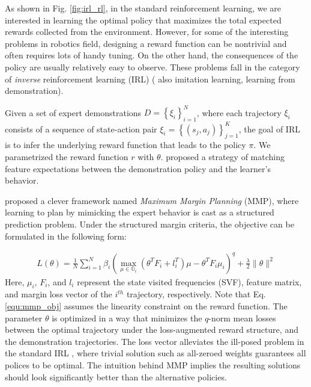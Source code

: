 \documentclass[../thesis.tex]{subfiles}
\begin{document}
As shown in Fig. \ref{fig:irl_rl}, in the standard reinforcement learning, we are interested in learning the optimal policy that maximizes the total expected rewards collected from the environment. 
However, for some of the interesting problems in robotics field, designing a reward function can be nontrivial and often requires lots of handy tuning. 
On the other hand, the consequences of the policy are usually relatively easy to observe. 
These problems fall in the category of \textit{inverse} reinforcement learning (IRL) \cite{ng2000algorithms} ( also imitation learning, learning from demonstration).



Given a set of expert demonstrations $D=\left\{ \xi_i \right\}_{i=1}^{N}$, where each trajectory $\xi_i$ consists of a sequence of state-action pair $\xi_i = \left\{ (s_j, a_j) \right\}_{j=1}^{K}$, the goal of IRL is to infer the underlying reward function that leads to the policy $\pi$. 
We parametrized the reward function $r$ with $\theta$. \citet{abbeel2004apprenticeship} proposed a strategy of matching feature expectations between the demonstration policy and the learner's behavior. 

\citet{ratliff2006maximum} proposed a clever framework named \textit{Maximum Margin Planning} (MMP), where learning to plan by mimicking the expert behavior is cast as a structured prediction problem. Under the structured margin criteria, the objective can be formulated in the following form:

\begin{align}
L(\theta) = \frac{1}{N} \sum^{N}_{i=1} \beta_i ( \max_{\mu \in \mathbb{G}_i}(\theta^T F_i + l_i^T)\mu - \theta^TF_i\mu_i )^q +  \frac{\lambda}{2} \| \theta \|^2 \label{equ:mmp_obj}
\end{align}
Here, $\mu_i$, $F_i$, and $l_i$ represent the state visited frequencies (SVF), feature matrix, and margin loss vector of the $i^{th}$ trajectory, respectively. 
Note that Eq. \ref{equ:mmp_obj} assumes the linearity constraint on the reward function. 
The parameter $\theta$ is optimized in a way that minimizes the $q$-norm mean losses between the optimal trajectory under the loss-augmented reward structure, and the demonstration trajectories. 
The loss vector alleviates the ill-posed problem in the standard IRL \cite{abbeel2004apprenticeship}, where trivial solution such as all-zeroed weights guarantees all polices to be optimal.
The intuition behind MMP implies the resulting solutions should look significantly better than the alternative policies.
\end{document}
